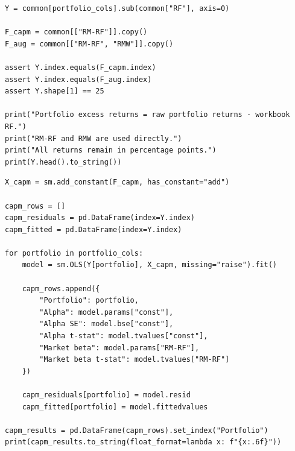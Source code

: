 \documentclass[11pt]{article}
\begin{document}
\begin{lstlisting}
Y = common[portfolio_cols].sub(common["RF"], axis=0)

F_capm = common[["RM-RF"]].copy()
F_aug = common[["RM-RF", "RMW"]].copy()

assert Y.index.equals(F_capm.index)
assert Y.index.equals(F_aug.index)
assert Y.shape[1] == 25

print("Portfolio excess returns = raw portfolio returns - workbook RF.")
print("RM-RF and RMW are used directly.")
print("All returns remain in percentage points.")
print(Y.head().to_string())
\end{lstlisting}
\begin{lstlisting}
X_capm = sm.add_constant(F_capm, has_constant="add")

capm_rows = []
capm_residuals = pd.DataFrame(index=Y.index)
capm_fitted = pd.DataFrame(index=Y.index)

for portfolio in portfolio_cols:
    model = sm.OLS(Y[portfolio], X_capm, missing="raise").fit()

    capm_rows.append({
        "Portfolio": portfolio,
        "Alpha": model.params["const"],
        "Alpha SE": model.bse["const"],
        "Alpha t-stat": model.tvalues["const"],
        "Market beta": model.params["RM-RF"],
        "Market beta t-stat": model.tvalues["RM-RF"]
    })

    capm_residuals[portfolio] = model.resid
    capm_fitted[portfolio] = model.fittedvalues

capm_results = pd.DataFrame(capm_rows).set_index("Portfolio")
print(capm_results.to_string(float_format=lambda x: f"{x:.6f}"))
\end{lstlisting}
\end{document}
